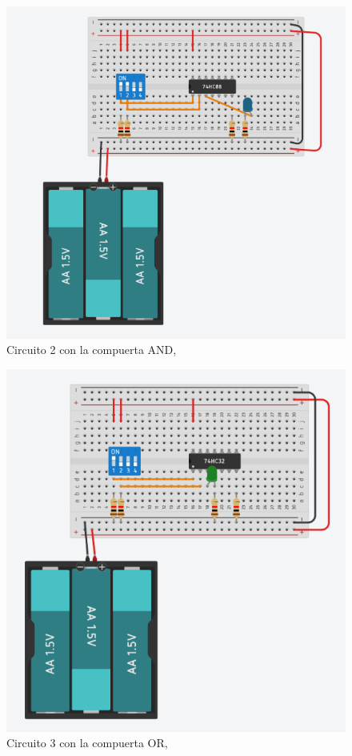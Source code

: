 \documentclass[stu, 12pt, letterpaper, donotrepeattitle, floatsintext, natbib, helv]{apa7}
\begin{document}
\begin{figure} [H]
    \centering
    \includegraphics[width=1\textwidth]{Circuito2.png}
    \caption{Circuito 2 con la compuerta AND, \cite{circuits}}
    \label{fig:AND}
\end{figure}

\begin{figure} [H]
    \centering
    \includegraphics[width=1\textwidth]{Circuito3.png}
    \caption{Circuito 3 con la compuerta OR, \cite{circuits}}
    \label{fig:OR} 
\end{figure}
\end{document}
